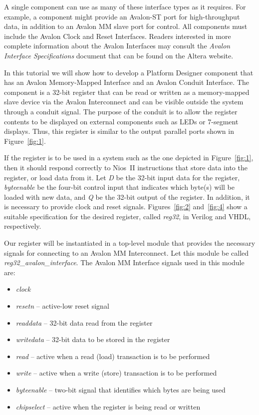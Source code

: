 \documentclass[11pt, twoside, pdftex]{article}
\begin{document}
A single component can use as many of these interface types as it requires. For example, 
a component might provide an Avalon-ST port for high-throughput data, in addition to an 
Avalon MM slave port for control.  All components must include the Avalon Clock and 
Reset Interfaces. Readers interested in more complete information about the Avalon Interfaces 
may consult the {\it Avalon Interface Specifications} document that can be found on 
the Altera website.

In this tutorial we will show how to develop a Platform Designer component that has an Avalon Memory-Mapped 
Interface and an Avalon Conduit Interface. The component is a 32-bit register that can be 
read or written as a memory-mapped slave device via the Avalon Interconnect and can be visible 
outside the system through a conduit signal.  The purpose of the conduit is to allow the 
register contents to be displayed on external components such as LEDs or 7-segment displays.
Thus, this register is similar to the output parallel ports shown in Figure~\ref{fig:1}.

If the register is to be used in a system such as the one depicted in Figure~\ref{fig:1}, 
then it should respond correctly to Nios~II instructions that store data into the register, 
or load data from it.  Let {\it D} be the 32-bit input data for the register, 
{\it byteenable} be the four-bit control input that indicates which byte(s) will be loaded 
with new data, and {\it Q} be the 32-bit output of the register.
In addition, it is necessary to provide clock and reset signals. 
Figures~\ref{fig:2} and~\ref{fig:4} show a suitable specification for the desired register, 
called {\it reg32}, in Verilog and VHDL, respectively.

Our register will be instantiated in a top-level module that provides the necessary
signals for connecting to an Avalon MM Interconnect. Let this module be 
called {\it reg32\_avalon\_interface}.  The Avalon MM Interface signals used in this
module are:
\begin{itemize}
\item {\it clock}
\item {\it resetn} -- active-low reset signal
\item {\it readdata} -- 32-bit data read from the register
\item {\it writedata} -- 32-bit data to be stored in the register
\item {\it read} -- active when a read (load) transaction is to be performed
\item {\it write} -- active when a write (store) transaction is to be performed
\item {\it byteenable} -- two-bit signal that identifies which bytes are being used
\item {\it chipselect} -- active when the register is being read or written
\end{itemize}
\end{document}
